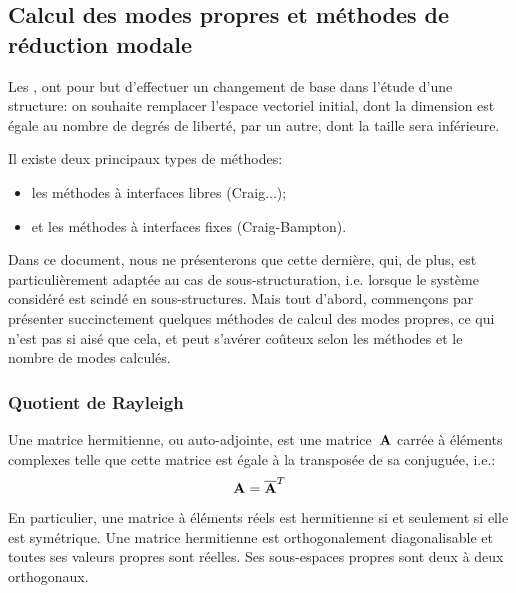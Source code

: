 \medskip
\subsection{Calcul des modes propres et méthodes de réduction modale}

Les , ont pour but d'effectuer un changement de base dans l'étude d'une structure: on souhaite remplacer l'espace vectoriel initial, dont la dimension est égale au nombre de degrés de liberté, par un autre, dont la taille sera inférieure.

\medskip
Il existe deux principaux types de méthodes:
\begin{itemize}
  \item les méthodes à interfaces libres (Craig...);
  \item et les méthodes à interfaces fixes (Craig-Bampton).
\end{itemize}
Dans ce document, nous ne présenterons que cette dernière, qui, de plus, est particulièrement adaptée au cas de sous-structuration, i.e. lorsque le système considéré est scindé en sous-structures.
\medskipvm
Mais tout d'abord, commençons par présenter succinctement quelques méthodes de calcul des modes propres, ce qui n'est pas si aisé que cela, et peut s'avérer coûteux selon les méthodes et le nombre de modes calculés.

\medskip
\subsubsection{Quotient de Rayleigh}

\begin{definition}
Une matrice hermitienne, ou auto-adjointe, est une matrice~$\MM{A}$ carrée à éléments complexes telle que cette matrice est égale à la transposée de sa conjuguée, i.e.:
\begin{equation}
\MM{A} = \overline{\MM{A}}^T
\end{equation}
\end{definition}
En particulier, une matrice à éléments réels est hermitienne si et seulement si elle est symétrique.
\medskipvm
Une matrice hermitienne est orthogonalement diagonalisable et toutes ses valeurs propres sont réelles. Ses sous-espaces propres sont deux à deux orthogonaux.

